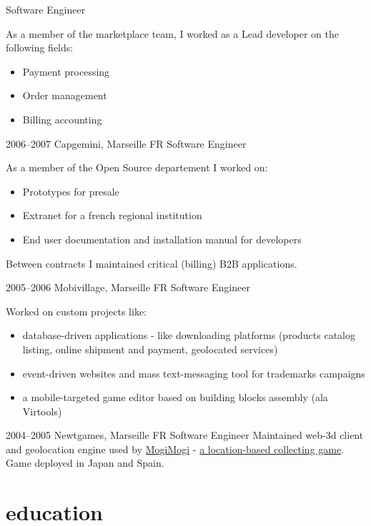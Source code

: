 \documentclass[]{friggeri}
\begin{document}
\begin{entrylist}
    {Software Engineer}
    {As a member of the marketplace team, I worked as a Lead developer on the
    following fields:
    \begin{itemize}
    \item Payment processing
    \item Order management
    \item Billing accounting
    \end{itemize}}
  \entry
    {2006–2007}
    {Capgemini, Marseille FR}
    {Software Engineer}
    {As a member of the Open Source departement I worked on:
    \begin{itemize}
    \item Prototypes for presale
    \item Extranet for a french regional institution
    \item End user documentation and installation manual for developers
    \end{itemize}
    Between contracts I maintained critical (billing) B2B applications.}
\end{entrylist}

\clearpage

\begin{entrylist}
  \entry
    {2005–2006}
    {Mobivillage, Marseille FR}
    {Software Engineer}
    {Worked on custom projects like:
    \begin{itemize}
    \item database-driven applications - like downloading platforms
    (products catalog listing, online shipment and payment, geolocated services)
    \item event-driven websites and mass text-messaging tool for
    trademarks campaigns
    \item a mobile-targeted game editor based on building blocks
    assembly (ala Virtools)
    \end{itemize}}
  \entry
    {2004–2005}
    {Newtgames, Marseille FR}
    {Software Engineer}
    {Maintained web-3d client and geolocation engine used by
    \href{http://mogimogi.com}{MogiMogi} - \href{http://thefeaturearchives.com/100501.html}{a location-based collecting game}.
    Game deployed in Japan and Spain.}
\end{entrylist}

\section{education}
\end{document}
